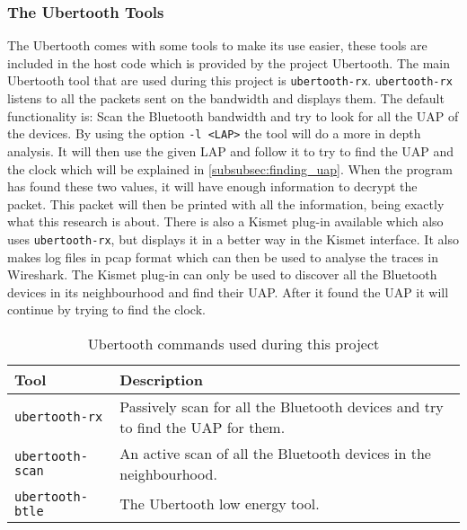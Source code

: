 \subsubsection{The Ubertooth Tools}
\label{subsubsec:ubertooth_tools}
The Ubertooth comes with some tools to make its use easier, these tools are included in the host code which is provided by the project Ubertooth.
The main Ubertooth tool that are used during this project is \verb|ubertooth-rx|. \verb|ubertooth-rx| listens to all the packets sent on the bandwidth and displays them. The default functionality is: Scan the Bluetooth bandwidth and try to look for all the UAP of the devices. By using the option \verb|-l <LAP>| the tool will do a more in depth analysis. It will then use the given LAP and follow it to try to find the UAP and the clock which will be explained in \ref{subsubsec:finding_uap}. When the program has found these two values, it will have enough information to decrypt the packet. This packet will then be printed with all the information, being exactly what this research is about. \pend There is also a Kismet plug-in available which also uses \verb|ubertooth-rx|, but displays it in a better way in the Kismet interface. It also makes log files in pcap format which can then be used to analyse the traces in Wireshark. The Kismet plug-in can only be used to discover all the Bluetooth devices in its neighbourhood and find their UAP. After it found the UAP it will continue by trying to find the clock.

\begin{table}[!h]
\begin{tabular}{|l|l|}
\hline
Tool & Description \\
\hline
\verb|ubertooth-rx| & Passively scan for all the Bluetooth devices and try to find the UAP for them. \\
\hline
\verb|ubertooth-scan| & An active scan of all the Bluetooth devices in the neighbourhood.  \\
\hline
\verb|ubertooth-btle| & The Ubertooth low energy tool. \\
\hline
\end{tabular}
\caption{Ubertooth commands used during this project}
\label{tab:ubertooth_tools}
\end{table}
